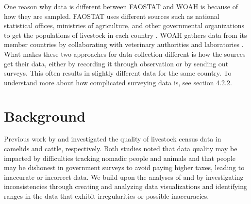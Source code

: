 \documentclass{article}
\begin{document}
One reason why data is different between FAOSTAT and WOAH is because of how they are sampled. FAOSTAT uses different sources such as national statistical offices, ministries of agriculture, and other governmental organizations \citep{faostat_data_nodate} to get the populations of livestock in each country \citep{world_organization_for_animal_health_world_nodate}. WOAH gathers data from its member countries by collaborating with veterinary authorities and laboratories \citep{world_organization_for_animal_health_world_nodate}. What makes these two approaches for data collection different is how the sources get their data, either by recording it through observation or by sending out surveys. This often results in slightly different data for the same country. To understand more about how complicated surveying data is, see section 4.2.2.

\section{Background}
Previous work by \cite{faye_how_2020}  and \cite{geoffry_fordyce_australian_nodate} investigated the quality of livestock census data in camelids and cattle, respectively.  Both studies noted that data quality may be impacted by difficulties tracking nomadic people and animals and that people may be dishonest in government surveys to avoid paying higher taxes, leading to inaccurate or incorrect data. We build upon the analyses of \cite{faye_how_2020} and \cite{geoffry_fordyce_australian_nodate} by investigating inconsistencies through creating and analyzing data visualizations and identifying ranges in the data that exhibit irregularities or possible inaccuracies. 
\end{document}
